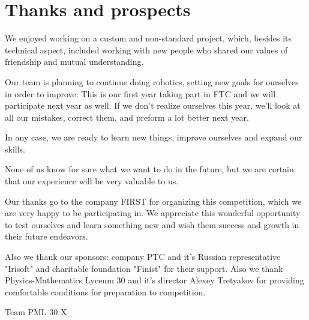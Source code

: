 
\section{Thanks and prospects} 
    We enjoyed working on a custom and non-standard project, which, besides its technical aspect, included working with new people who shared our values of friendship and mutual understanding. 
    
    Our team is planning to continue doing robotics, setting new goals for ourselves in order to improve. This is our first year taking part in FTC and we will participate next year as well. If we don't realize ourselves this year, we'll look at all our mistakes, correct them, and preform a lot better next year.
   
    In any case, we are ready to learn new things, improve ourselves and expand our skills. 
    
    None of us know for sure what we want to do in the future, but we are certain that our experience will be very valuable to us. 
    
    Our thanks go to the company FIRST for organizing this competition, which we are very happy to be participating in. We appreciate this wonderful opportunity to test ourselves and learn something new and wish them success and growth in their future endeavors.
    
    Also we thank our sponsors: company PTC and it's Russian representative "Irisoft" and charitable foundation "Finist" for their support. Also we thank Physics-Mathematics Lyceum 30 and it's director Alexey Tretyakov for providing comfortable conditions for preparation to competition.
   
    
    \begin{center}
      Team PML 30 X
    \end{center}
    
    \vspace{0.5em}
    
